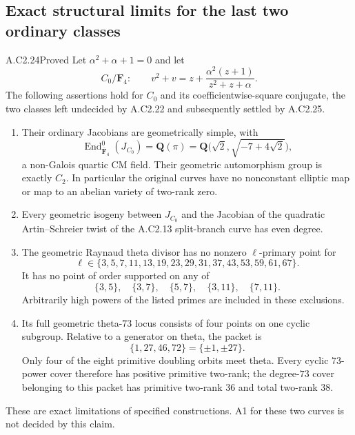 \subsection{Exact structural limits for the last two ordinary classes}

\begin{claim}{A.C2.24}{Proved}
Let $\alpha^2+\alpha+1=0$ and let
\[
 C_0/\mathbf F_4:\qquad
 v^2+v=z+\frac{\alpha^2(z+1)}{z^2+z+\alpha}.
                                                        \tag{C2.70}
\]
The following assertions hold for $C_0$ and its
coefficientwise-square conjugate, the two classes
left undecided by A.C2.22 and subsequently
settled by A.C2.25.
\begin{enumerate}
\item Their ordinary Jacobians are geometrically simple, with
\[
 \operatorname{End}^0_{\overline{\mathbf F}_4}(J_{C_0})
 =\mathbf Q(\pi)
 =\mathbf Q\bigl(\sqrt2,\sqrt{-7+4\sqrt2}\bigr),
                                                        \tag{C2.71}
\]
a non-Galois quartic CM field. Their geometric
automorphism group is exactly $C_2$. In particular
the original curves have no nonconstant elliptic
map or map to an abelian variety of two-rank zero.
\item Every geometric isogeny between $J_{C_0}$ and the
Jacobian of the quadratic Artin--Schreier twist of
the A.C2.13 split-branch curve has even degree.
\item The geometric Raynaud theta divisor has no
nonzero $\ell$-primary point for
\[
 \ell\in\{3,5,7,11,13,19,23,29,31,37,43,53,59,61,67\}.
                                                        \tag{C2.72}
\]
It has no point of order supported on any of
\[
 \{3,5\},\quad\{3,7\},\quad\{5,7\},\quad
 \{3,11\},\quad\{7,11\}.                              \tag{C2.73}
\]
Arbitrarily high powers of the listed primes are
included in these exclusions.
\item Its full geometric theta-$73$ locus consists of
four points on one cyclic subgroup. Relative to a
generator on theta, the packet is
\[
                    \{1,27,46,72\}=\{\pm1,\pm27\}.
                                                        \tag{C2.74}
\]
Only four of the eight primitive doubling orbits
meet theta. Every cyclic $73$-power cover therefore has
positive primitive two-rank; the degree-$73$ cover belonging
to this packet has primitive two-rank $36$ and
total two-rank $38$.
\end{enumerate}
These are exact limitations of specified
constructions. A1 for these two curves is not
decided by this claim.
\end{claim}
